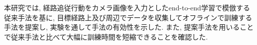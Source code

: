 
本研究では, 経路追従行動をカメラ画像を入力としたend-to-end学習で模倣する従来手法を基に, 目標経路上及び周辺でデータを収集してオフラインで訓練する手法を提案し, 実験を通して手法の有効性を示した. また, 提案手法を用いることで従来手法と比べて大幅に訓練時間を短縮できることを確認した.  